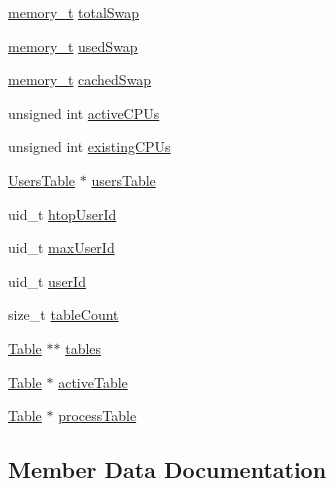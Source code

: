 \begin{DoxyCompactItemize}
\item 
\hyperlink{Machine_8h_ac8c2c5995f64727051f4034a810e5b07}{memory\+\_\+t} \hyperlink{structMachine___ac5c410ad1faf68a90c4acb4200919dda}{total\+Swap}
\item 
\hyperlink{Machine_8h_ac8c2c5995f64727051f4034a810e5b07}{memory\+\_\+t} \hyperlink{structMachine___a68798d7c133548a9a28718f2e51d4cd8}{used\+Swap}
\item 
\hyperlink{Machine_8h_ac8c2c5995f64727051f4034a810e5b07}{memory\+\_\+t} \hyperlink{structMachine___a9e5f09ea01656c4d0087acf6cedd6254}{cached\+Swap}
\item 
unsigned int \hyperlink{structMachine___aa46a5b354570258b24f5750fe61602ff}{active\+C\+P\+Us}
\item 
unsigned int \hyperlink{structMachine___a4fd6a11ebb6b2f21b64ea4ef86915ebc}{existing\+C\+P\+Us}
\item 
\hyperlink{UsersTable_8h_a6fba6179e89888312f235179e5a04de6}{Users\+Table} $\ast$ \hyperlink{structMachine___af77e01ddf7e141ce1182ec9786163403}{users\+Table}
\item 
uid\+\_\+t \hyperlink{structMachine___a19ed6002f674cad46e95264c544ab96d}{htop\+User\+Id}
\item 
uid\+\_\+t \hyperlink{structMachine___ab7a40f7095392320890d5bb91152ba01}{max\+User\+Id}
\item 
uid\+\_\+t \hyperlink{structMachine___a045036b9cd773bfb4134415ee50c299f}{user\+Id}
\item 
size\+\_\+t \hyperlink{structMachine___a5565ee68245054da75f3973f9b9bd893}{table\+Count}
\item 
\hyperlink{Table_8h_a799795dd983fdfee2e48cc52cdceb05d}{Table} $\ast$$\ast$ \hyperlink{structMachine___a9e398a39c53fcd70e819ff7130cf3fa4}{tables}
\item 
\hyperlink{Table_8h_a799795dd983fdfee2e48cc52cdceb05d}{Table} $\ast$ \hyperlink{structMachine___a03fc72fc00d68bd24128c056c70346b2}{active\+Table}
\item 
\hyperlink{Table_8h_a799795dd983fdfee2e48cc52cdceb05d}{Table} $\ast$ \hyperlink{structMachine___a3a78d52d27d494a067d74b0dcc8e56f2}{process\+Table}
\end{DoxyCompactItemize}


\subsection{Member Data Documentation}
\mbox{\label{structMachine___aa46a5b354570258b24f5750fe61602ff}} 
